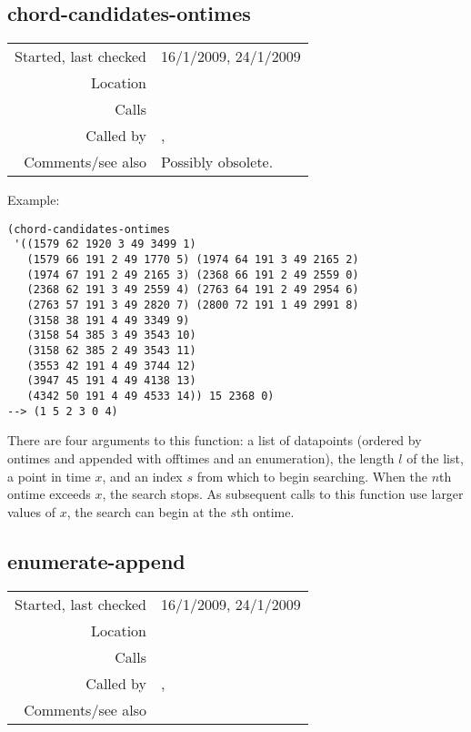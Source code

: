 \subsection*{chord-candidates-ontimes}\label{fun:chord-candidates-ontimes}

\vspace{0.3cm}
\begin{tabular}{r|p{8cm}}
Started, last checked & 16/1/2009, 24/1/2009 \\
Location & \nameref{sec:segmentation} \\
Calls & \nameref{fun:my-last} \\
Called by & \nameref{fun:segment}, \nameref{fun:segment-strict} \\
Comments/see also & Possibly obsolete.
\end{tabular}

\vspace{0.5cm}
\noindent Example:
\begin{verbatim}
(chord-candidates-ontimes
 '((1579 62 1920 3 49 3499 1)
   (1579 66 191 2 49 1770 5) (1974 64 191 3 49 2165 2)
   (1974 67 191 2 49 2165 3) (2368 66 191 2 49 2559 0)
   (2368 62 191 3 49 2559 4) (2763 64 191 2 49 2954 6)
   (2763 57 191 3 49 2820 7) (2800 72 191 1 49 2991 8)
   (3158 38 191 4 49 3349 9)
   (3158 54 385 3 49 3543 10)
   (3158 62 385 2 49 3543 11)
   (3553 42 191 4 49 3744 12)
   (3947 45 191 4 49 4138 13)
   (4342 50 191 4 49 4533 14)) 15 2368 0)
--> (1 5 2 3 0 4)
\end{verbatim}

\noindent There are four arguments to this function: a
list of datapoints (ordered by ontimes and appended
with offtimes and an enumeration), the length $l$ of
the list, a point in time $x$, and an index $s$ from
which to begin searching. When the $n$th ontime
exceeds $x$, the search stops. As subsequent calls to
this function use larger values of $x$, the search can
begin at the $s$th ontime.


\subsection*{enumerate-append}\label{fun:enumerate-append}

\vspace{0.3cm}
\begin{tabular}{r|p{8cm}}
Started, last checked & 16/1/2009, 24/1/2009 \\
Location & \nameref{sec:segmentation} \\
Calls & \\
Called by & \nameref{fun:segments}, \nameref{fun:segments-strict} \\
Comments/see also &
\end{tabular}

